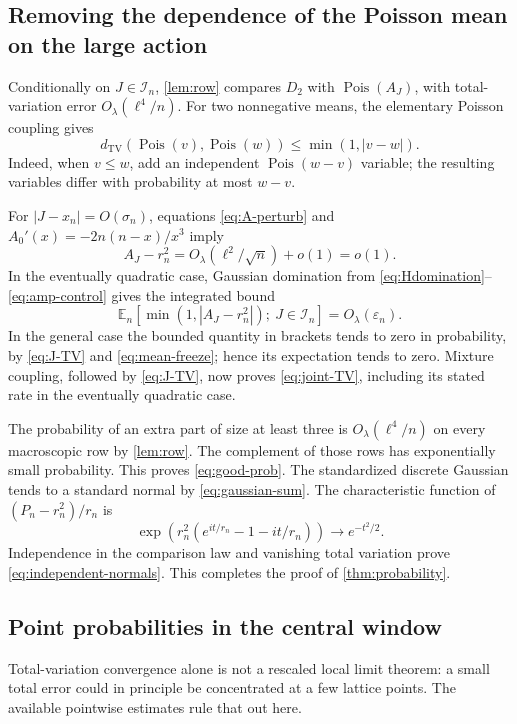 \documentclass[11pt,a4paper]{article}
\theoremstyle{definition}
\newcommand{\E}{\mathbb E}
\newcommand{\TV}{d_{\mathrm{TV}}}
\newcommand{\Pois}{\operatorname{Pois}}
\newcommand{\epsn}{\varepsilon_n}
\numberwithin{equation}{section}
\begin{document}
\subsection{Removing the dependence of the Poisson mean on the large action}
Conditionally on \(J\in\mathcal I_n\), \cref{lem:row} compares
\(D_2\) with \(\Pois(A_J)\), with total-variation error
\(O_\lambda(\ell^4/n)\). For two nonnegative means, the elementary
Poisson coupling gives
\begin{equation}
 \TV(\Pois(v),\Pois(w))\le \min(1,|v-w|).
 \label{eq:poisson-coupling}
\end{equation}
Indeed, when \(v\le w\), add an independent \(\Pois(w-v)\) variable;
the resulting variables differ with probability at most \(w-v\).

For \(|J-x_n|=O(\sigma_n)\), equations
\eqref{eq:A-perturb} and
\(A_0'(x)=-2n(n-x)/x^3\) imply
\begin{equation}
 A_J-r_n^2=O_\lambda(\ell^2/\sqrt n)+o(1)=o(1).
 \label{eq:mean-freeze}
\end{equation}
In the eventually quadratic case, Gaussian domination from
\eqref{eq:Hdomination}--\eqref{eq:amp-control} gives the integrated bound
\[
 \E_n\!\left[\min(1,|A_J-r_n^2|);\ J\in\mathcal I_n\right]
                                  =O_\lambda(\epsn).
\]
In the general case the bounded quantity in brackets tends to zero in
probability, by \eqref{eq:J-TV} and \eqref{eq:mean-freeze}; hence its
expectation tends to zero. Mixture coupling, followed by
\eqref{eq:J-TV}, now proves \eqref{eq:joint-TV}, including its stated
rate in the eventually quadratic case.

The probability of an extra part of size at least three is
\(O_\lambda(\ell^4/n)\) on every macroscopic row by \cref{lem:row}.
The complement of those rows has exponentially small probability. This
proves \eqref{eq:good-prob}.
The standardized discrete Gaussian tends to a standard normal by
\eqref{eq:gaussian-sum}. The characteristic function of
\((P_n-r_n^2)/r_n\) is
\[
 \exp\!\left(r_n^2(e^{it/r_n}-1-it/r_n)\right)
                         \longrightarrow e^{-t^2/2}.
\]
Independence in the comparison law and vanishing total variation prove
\eqref{eq:independent-normals}. This completes the proof of
\cref{thm:probability}.

\subsection{Point probabilities in the central window}
Total-variation convergence alone is not a rescaled local limit theorem:
a small total error could in principle be concentrated at a few lattice
points. The available pointwise estimates rule that out here.
\end{document}
